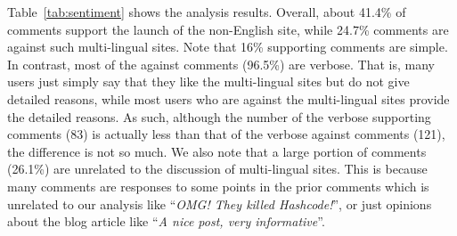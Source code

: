Table~\ref{tab:sentiment} shows the analysis results.
Overall, about 41.4\% of comments support the launch of the non-English site, while 24.7\% comments are against such multi-lingual sites.
Note that 16\% supporting comments are simple.
In contrast, most of the against comments (96.5\%) are verbose. 
That is, many users just simply say that they like the multi-lingual sites but do not give detailed reasons, while most users who are against the multi-lingual sites provide the detailed reasons.
As such, although the number of the verbose supporting comments (83) is actually less than that of the verbose against comments (121), the difference is not so much.
We also note that a large portion of comments (26.1\%) are unrelated to the discussion of multi-lingual sites.
This is because many comments are responses to some points in the prior comments which is unrelated to our analysis like ``\textit{OMG! They killed Hashcode!}'', or just opinions about the blog article like ``\textit{A nice post, very informative}''.
 
\begin{comment}
To check how much people agree or disagree with the launch of non-English Stack Overflow, we crawl all comments of the blog articles which are about the new-site announcement.
From the 4 announcements articles, we totally crawled 348 comments.
We first translate the non-English comments into English for user review by Google Translate, and then manually classify all these comments into 4 categories, \textit{against}, \textit{support}, \textit{neutral}, and \textit{unrelated} by reading each comment throughly.
The overall results are displayed in Table~\ref{tab:sentiment}.
We can see that for the launch of all non-English Stack Overflow, there are more users (41.4\%) supporting the decision than that against the decision (24.7\%).
But note some positive comments are very short like {\small Fair!}, {\small Great!!!}, {\small Welcome!}, {\small Congratulations!}, which may be just polite comments with no intrinsic meaning.
So, the number of users with positive opinions may be exaggerated, and the real number is not be too much higher than the developers with negative opinions. 
\end{comment}

